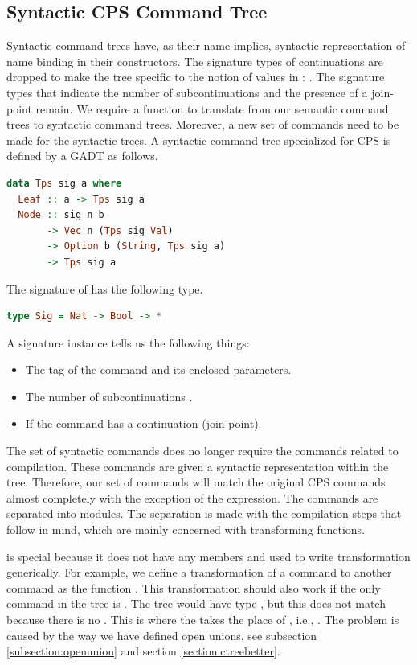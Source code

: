 \subsection{\label{subsection:syntree}Syntactic CPS Command Tree}
Syntactic command trees have, as their name implies, syntactic representation of name binding in their constructors. The signature types of continuations are dropped to make the tree specific to the notion of values in : . The signature types that indicate the number of subcontinuations and the presence of a join-point remain. We require a function to translate from our semantic command trees to syntactic command trees. Moreover, a new set of commands need to be made for the syntactic trees. A syntactic command tree specialized for CPS  is defined by a GADT as follows.

\begin{lstlisting}[language=Haskell]
data Tps sig a where
  Leaf :: a -> Tps sig a
  Node :: sig n b
       -> Vec n (Tps sig Val)
       -> Option b (String, Tps sig a)
       -> Tps sig a
\end{lstlisting}

The signature of  has the following type.

\begin{lstlisting}[language=Haskell]
type Sig = Nat -> Bool -> *
\end{lstlisting}

A signature instance  tells us the following things:

\begin{itemize}
\item The tag of the command and its enclosed parameters.
\item The number of subcontinuations .
\item If the command has a continuation (join-point).
\end{itemize}

The set of syntactic commands does no longer require the commands related to compilation. These commands are given a syntactic representation within the tree. Therefore, our set of commands will match the original CPS commands almost completely with the exception of the  expression. The commands are separated into modules. The separation is made with the compilation steps that follow in mind, which are mainly concerned with transforming functions. 

 is special because it does not have any members and used to write transformation generically. For example, we define a transformation of a command to another command as the function . This transformation should also work if the only command in the tree is . The tree would have type , but this does not match because there is no . This is where the  takes the place of , i.e., . The  problem is caused by the way we have defined open unions, see subsection \ref{subsection:openunion} and section \ref{section:ctreebetter}.

